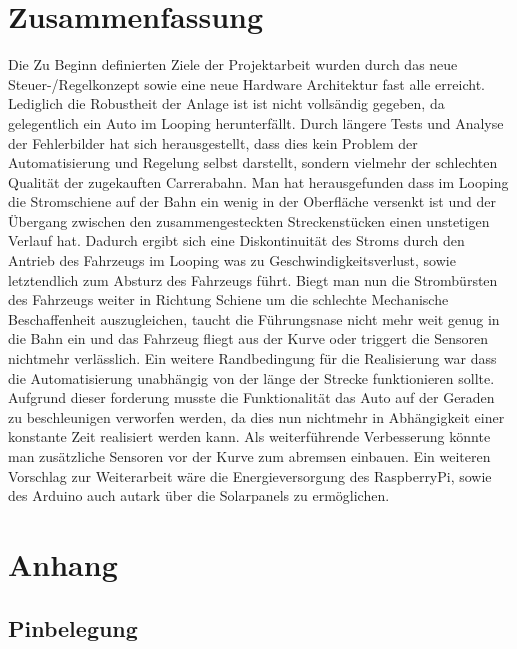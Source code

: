 \documentclass[a4paper, 11pt]{report}
\begin{document}
\chapter{Zusammenfassung}
Die Zu Beginn definierten Ziele der Projektarbeit wurden durch das neue Steuer-/Regelkonzept sowie eine neue Hardware Architektur fast alle erreicht. Lediglich die Robustheit der Anlage ist ist nicht vollsändig gegeben, da gelegentlich ein Auto im Looping herunterfällt.
Durch längere Tests und Analyse der Fehlerbilder hat sich herausgestellt, dass dies kein Problem der Automatisierung und Regelung selbst darstellt, sondern vielmehr der schlechten Qualität der zugekauften Carrerabahn.
Man hat herausgefunden dass im Looping die Stromschiene auf der Bahn ein wenig in der Oberfläche versenkt ist und der Übergang zwischen den zusammengesteckten Streckenstücken einen unstetigen Verlauf hat. Dadurch ergibt sich eine Diskontinuität des Stroms durch den Antrieb des Fahrzeugs im Looping was zu Geschwindigkeitsverlust, sowie letztendlich zum Absturz des Fahrzeugs führt. Biegt man nun die Strombürsten des Fahrzeugs weiter in Richtung Schiene um die schlechte Mechanische Beschaffenheit auszugleichen, taucht die Führungsnase nicht mehr weit genug in die Bahn ein und das Fahrzeug fliegt aus der Kurve oder triggert die Sensoren nichtmehr verlässlich.
Ein weitere Randbedingung für die Realisierung war dass die Automatisierung unabhängig von der länge der Strecke funktionieren sollte.
Aufgrund dieser forderung musste die Funktionalität das Auto auf der Geraden zu beschleunigen verworfen werden, da dies nun nichtmehr in Abhängigkeit einer konstante Zeit realisiert werden kann. Als weiterführende Verbesserung könnte man zusätzliche Sensoren vor der Kurve zum abremsen einbauen.
Ein weiteren Vorschlag zur Weiterarbeit wäre die Energieversorgung des RaspberryPi, sowie des Arduino auch autark über die Solarpanels zu ermöglichen.


\chapter{Anhang}
\section{Pinbelegung}
\end{document}

